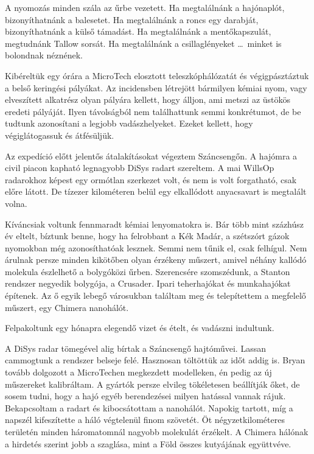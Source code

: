\documentclass[10pt]{memoir}
\begin{document}
A nyomozás minden szála az űrbe vezetett. Ha megtalálnánk a hajónaplót,
bizonyíthatnánk a balesetet. Ha megtalálnánk a roncs egy darabját,
bizonyíthatnánk a külső támadást. Ha megtalálnánk a mentőkapszulát, megtudnánk
Tallow sorsát. Ha megtalálnánk a csillaglényeket \dots\ minket is bolondnak
néznének.

Kibéreltük egy órára a MicroTech elosztott teleszkóphálózatát és
végigpásztáztuk a belső keringési pályákat. Az incidensben létrejött bármilyen
kémiai nyom, vagy elveszített alkatrész olyan pályára kellett, hogy álljon, ami
metszi az üstökös eredeti pályáját. Ilyen távolságból nem találhattunk semmi
konkrétumot, de be tudtunk azonosítani a legjobb vadászhelyeket. Ezeket
kellett, hogy végiglátogassuk és átfésüljük.

Az expedíció előtt jelentős átalakításokat végeztem Száncsengőn. A hajómra a
civil piacon kapható legnagyobb DiSys radart szereltem. A mai WillsOp
radarokhoz képest egy ormótlan szerkezet volt, és nem is volt forgatható, csak
előre látott. De tízezer kilométeren belül egy elkallódott anyacsavart is
megtalált volna.

Kíváncsiak voltunk fennmaradt kémiai lenyomatokra is. Bár több mint százhúsz év
eltelt, bíztunk benne, hogy ha felrobbant a Kék Madár, a szétszórt gázok
nyomokban még azonosíthatóak lesznek. Semmi nem tűnik el, csak felhígul. Nem
árulnak persze minden kikötőben olyan érzékeny műszert, amivel néhány kallódó
molekula észlelhető a bolygóközi űrben. Szerencsére szomszédunk, a Stanton
rendszer negyedik bolygója, a Crusader. Ipari teherhajókat és munkahajókat
építenek. Az ő egyik lebegő városukban találtam meg és telepítettem a megfelelő
műszert, egy Chimera nanohálót.

Felpakoltunk egy hónapra elegendő vizet és ételt, és vadászni indultunk.

A DiSys radar tömegével alig bírtak a Száncsengő hajtóművei. Lassan cammogtunk
a rendszer belseje felé. Hasznosan töltöttük az időt addig is. Bryan tovább
dolgozott a MicroTechen megkezdett modelleken, én pedig az új műszereket
kalibráltam. A gyártók persze elvileg tökéletesen beállítják őket, de sosem
tudni, hogy a hajó egyéb berendezései milyen hatással vannak rájuk.
Bekapcsoltam a radart és kibocsátottam a nanohálót. Napokig tartott, míg a
napszél kifeszítette a háló végtelenül finom szövetét. Öt négyzetkilométeres
területén minden háromatomnál nagyobb molekulát érzékelt. A Chimera hálónak a
hirdetés szerint jobb a szaglása, mint a Föld összes kutyájának együttvéve.
\end{document}
